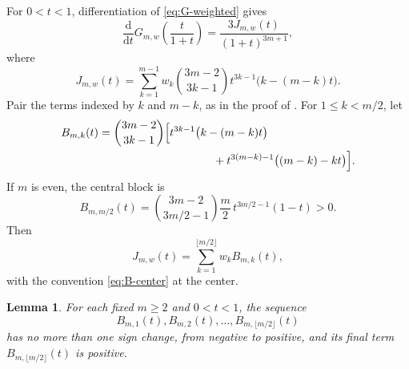 \documentclass[11pt,a4paper]{amsart}
\numberwithin{equation}{section}
\theoremstyle{plain}
\newtheorem{lemma}[theorem]{Lemma}
\theoremstyle{definition}
\begin{document}
For \(0<t<1\), differentiation of \eqref{eq:G-weighted} gives
\begin{equation}\label{eq:J-weighted}
 \frac{\mathrm d}{\mathrm d t}G_{m,w}\!\left(\frac{t}{1+t}\right)
 =\frac{3J_{m,w}(t)}{(1+t)^{3m+1}},
\end{equation}
where
\begin{equation}\label{eq:Jw-def}
 J_{m,w}(t)
 =\sum_{k=1}^{m-1}w_k\binom{3m-2}{3k-1}t^{3k-1}
 \bigl(k-(m-k)t\bigr).
\end{equation}
Pair the terms indexed by \(k\) and \(m-k\), as in the proof of
\cite[Thm.~2]{KarpZhang2024LogConcavity}.  For \(1\le k<m/2\), let
\begin{align}
 B_{m,k}(t)
 &=\binom{3m-2}{3k-1}
 \Bigl[t^{3k-1}\bigl(k-(m-k)t\bigr)\notag\\
 &\hspace{36mm}
 +t^{3(m-k)-1}\bigl((m-k)-kt\bigr)\Bigr].
 \label{eq:B-def}
\end{align}
If \(m\) is even, the central block is
\begin{equation}\label{eq:B-center}
 B_{m,m/2}(t)
 =\binom{3m-2}{3m/2-1}\frac m2\,t^{3m/2-1}(1-t)>0.
\end{equation}
Then
\[
 J_{m,w}(t)
 =\sum_{k=1}^{\lfloor m/2\rfloor}w_kB_{m,k}(t),
\]
with the convention \eqref{eq:B-center} at the center.

\begin{lemma}\label{lem:block-sign}
For each fixed \(m\ge2\) and \(0<t<1\), the sequence
\[
 B_{m,1}(t),B_{m,2}(t),\dots,B_{m,\lfloor m/2\rfloor}(t)
\]
has no more than one sign change, from negative to positive, and its final term
\(B_{m,\lfloor m/2\rfloor}(t)\) is positive.
\end{lemma}
\end{document}
